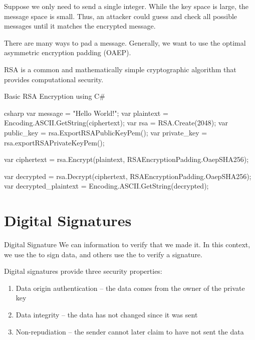 \documentclass[12pt]{report}
\begin{document}
Suppose we only need to send a single integer. While the key space is large, the message space is small. Thus, an attacker could guess and check all possible messages until it matches the encrypted message.

There are many ways to pad a message. Generally, we want to use the optimal asymmetric encryption padding (OAEP).

\begin{dfnbox}{RSA}{}
     is a common and mathematically simple cryptographic algorithm that provides computational security.
\end{dfnbox}

\begin{codebox}{Basic RSA Encryption using C\#}{}{}
    \begin{amzcode}{csharp}
        var message = "Hello World!";
        var plaintext = Encoding.ASCII.GetString(ciphertext);
        var rsa = RSA.Create(2048);
        var public_key = rsa.ExportRSAPublicKeyPem();
        var private_key = rsa.exportRSAPrivateKeyPem();

        var ciphertext = rsa.Encrypt(plaintext, RSAEncryptionPadding.OaepSHA256);

        var decrypted = rsa.Decrypt(ciphertext, RSAEncryptionPadding.OaepSHA256);
        var decrypted_plaintext = Encoding.ASCII.GetString(decrypted);
    \end{amzcode}
\end{codebox}

\section{Digital Signatures}

\begin{dfnbox}{Digital Signature}{}
    We can  information to verify that we made it. In this context, we use the  to sign data, and others use the  to verify a signature.
\end{dfnbox}

Digital signatures provide three security properties:
\begin{enumerate}[noitemsep]
    \item Data origin authentication -- the data comes from the owner of the private key
    \item Data integrity -- the data has not changed since it was sent
    \item Non-repudiation -- the sender cannot later claim to have not sent the data
\end{enumerate}
\end{document}
